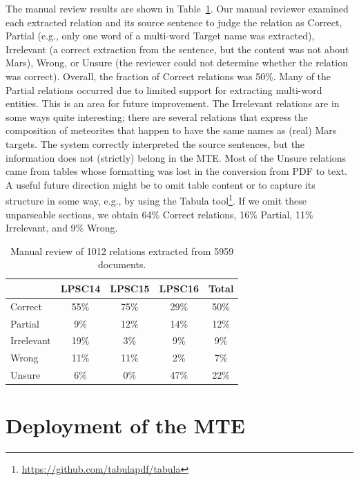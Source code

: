 \documentclass[letterpaper]{article} %
\begin{document}
The manual review results are shown in Table~\ref{tab:large}.  Our
manual reviewer examined each extracted relation and its source
sentence to judge the relation as Correct, Partial (e.g., only one
word of a multi-word Target name was extracted), Irrelevant (a correct
extraction from the sentence, but the content was not about Mars),
Wrong, or Unsure (the reviewer could not determine whether the
relation was correct).
%
Overall, the fraction of Correct relations was 50\%.  Many of the
Partial relations occurred due to limited support for extracting
multi-word entities.  This is an area for future improvement.
The Irrelevant relations are in some ways quite interesting;
there are several relations that express the composition of meteorites
that happen to have the same names as (real) Mars targets.  The system
correctly interpreted the source sentences, but the information does
not (strictly) belong in the MTE.
%
Most of the Unsure relations came from tables whose formatting was
lost in the conversion from PDF to text.  A useful future direction
might be to omit table content or to capture its structure in some
way, e.g., by using the Tabula
tool\footnote{\url{https://github.com/tabulapdf/tabula}}.  If we omit
these unparseable sections, we obtain 64\% Correct 
relations, 16\% Partial, 11\% Irrelevant, and 9\% Wrong.

\begin{table}
\caption{Manual review of 1012 relations extracted from 5959 documents.} 
\label{tab:large}
\begin{center}
\begin{tabular}{l|ccc|c}
        & LPSC14 & LPSC15 & LPSC16 & Total \\ \hline
Correct    & 55\% & 75\% & 29\% & 50\% \\ \hline
Partial    &  9\% & 12\% & 14\% & 12\% \\
Irrelevant & 19\% &  3\% &  9\% &  9\% \\
Wrong      & 11\% & 11\% &  2\% &  7\% \\
Unsure     &  6\% &  0\% & 47\% & 22\% \\
\hline
\end{tabular}
\end{center}
\end{table}

\section{Deployment of the MTE}
\end{document}
